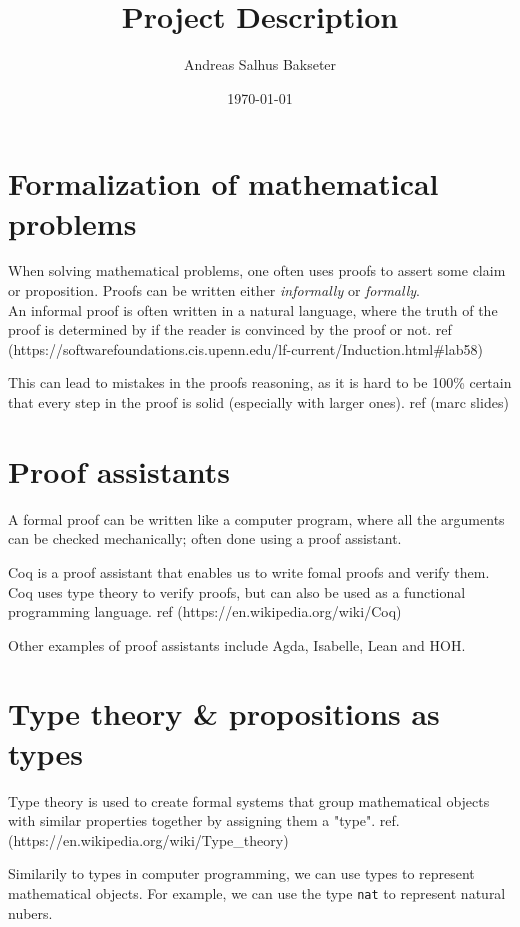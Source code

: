 \documentclass[a4paper,14pt]{article}
\title{Project Description}
\author{Andreas Salhus Bakseter}
\date{\today}
\begin{document}
\maketitle

\section{Formalization of mathematical problems}

When solving mathematical problems, one often uses proofs
to assert some claim or proposition. Proofs can be written either \textit{informally} or \textit{formally}.
\\

An informal proof is often written in a natural language, where the truth
of the proof is determined by if the reader is convinced by the proof or not.
ref (https://softwarefoundations.cis.upenn.edu/lf-current/Induction.html#lab58)

This can lead to mistakes in the proofs reasoning, as it is hard to be 100\%
certain that every step in the proof is solid (especially with larger ones).
ref (marc slides)


\section{Proof assistants}

A formal proof can be written like a computer program, where all the
arguments can be checked mechanically; often done using a proof assistant.

Coq is a proof assistant that enables us to write fomal proofs and verify them.
Coq uses type theory to verify proofs, but can also be used as a functional programming language.
ref (https://en.wikipedia.org/wiki/Coq)

Other examples of proof assistants include Agda, Isabelle, Lean and HOH.

\section{Type theory \& propositions as types}

Type theory is used to create formal systems that group mathematical objects
with similar properties together by assigning them a "type".
ref. (https://en.wikipedia.org/wiki/Type_theory)

Similarily to types in computer programming, we can use types to represent mathematical
objects. For example, we can use the type \texttt{nat} to represent natural nubers.
\end{document}
